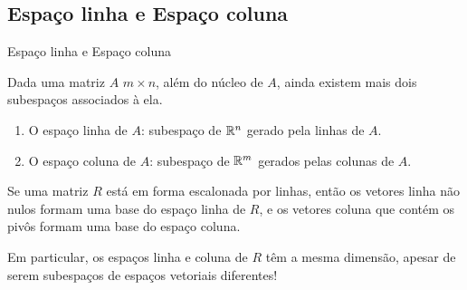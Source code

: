 \subsection*{Espaço linha e Espaço coluna}
\begin{frame}[label=lild]{Espaço linha e Espaço coluna}

Dada uma matriz $A$  $m\times n$, além do núcleo de $A$, ainda existem mais dois subespaços associados à ela.
\begin{enumerate}
\item {\color{blue}O espaço linha de $A$}: subespaço de $\mathbb{R}^n$ gerado pela linhas de $A$.
\item {\color{blue}O espaço coluna de $A$}: subespaço de $\mathbb{R}^m$ gerados pelas colunas de $A$.
\end{enumerate}

\begin{teo}
Se uma matriz {\color{red}$R$ está em forma escalonada por linhas}, então os vetores linha não nulos formam uma base do espaço linha de $R$, e os vetores coluna que contém os pivôs formam uma base do espaço coluna. 
\end{teo}

\begin{exampleblock}{}
Em particular, os espaços linha e coluna de $R$ têm a mesma dimensão, apesar de serem  subespaços de espaços vetoriais diferentes!
\end{exampleblock}

\end{frame}


